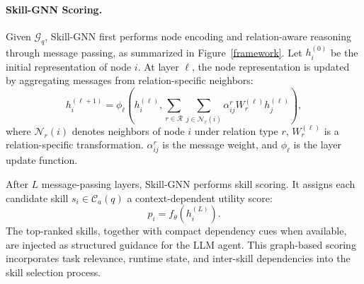 \documentclass[letterpaper]{article} %
\begin{document}
\paragraph{Skill-GNN Scoring.}
Given $\mathcal{G}_{q}$, Skill-GNN first performs node encoding and relation-aware reasoning through message passing, as summarized in Figure~\ref{framework}. Let $h_i^{(0)}$ be the initial representation of node $i$. At layer $\ell$, the node representation is updated by aggregating messages from relation-specific neighbors:
\begin{equation}
h_i^{(\ell+1)} =
\phi_{\ell}\left(
h_i^{(\ell)},
\sum_{r \in \mathcal{R}}
\sum_{j \in \mathcal{N}_{r}(i)}
\alpha_{ij}^{r} W_{r}^{(\ell)} h_j^{(\ell)}
\right),
\end{equation}
where $\mathcal{N}_{r}(i)$ denotes neighbors of node $i$ under relation type $r$, $W_{r}^{(\ell)}$ is a relation-specific transformation. $\alpha_{ij}^{r}$ is the message weight, and $\phi_{\ell}$ is the layer update function.

After $L$ message-passing layers, Skill-GNN performs skill scoring. It assigns each candidate skill $s_i \in \mathcal{C}_{a}(q)$ a context-dependent utility score:
\begin{equation}
p_i=f_{\theta}\left(h_i^{(L)}\right).
\end{equation}
The top-ranked skills, together with compact dependency cues when available, are injected as structured guidance for the LLM agent. This graph-based scoring incorporates task relevance, runtime state, and inter-skill dependencies into the skill selection process.
\end{document}
